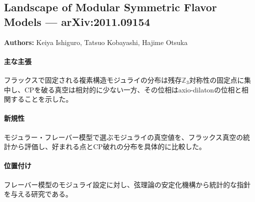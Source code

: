 \subsection{Landscape of Modular Symmetric Flavor Models --- arXiv:2011.09154}

\textbf{Authors:} Keiya Ishiguro, Tatsuo Kobayashi, Hajime Otsuka

\paragraph{主な主張}
フラックスで固定される複素構造モジュライの分布は残存\(\mathbb{Z}_3\)対称性の固定点に集中し、CPを破る真空は相対的に少ない一方、その位相はaxio-dilatonの位相と相関することを示した。 \cite{Ishiguro:2020tmo}

\paragraph{新規性}
モジュラー・フレーバー模型で選ぶモジュライの真空値を、フラックス真空の統計から評価し、好まれる点とCP破れの分布を具体的に比較した。

\paragraph{位置付け}
フレーバー模型のモジュライ設定に対し、弦理論の安定化機構から統計的な指針を与える研究である。
